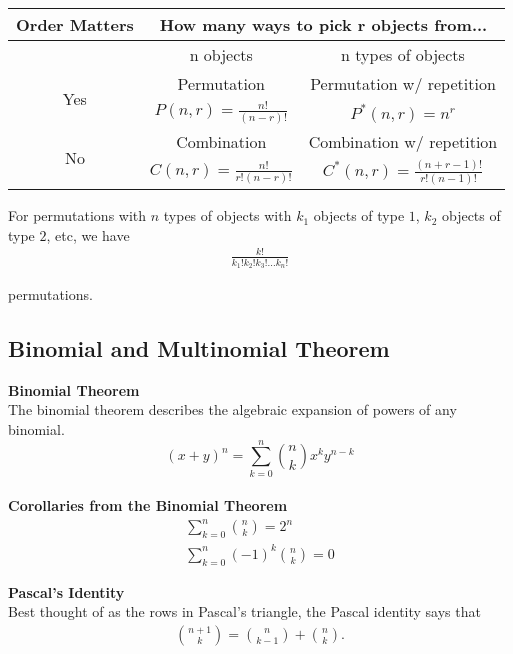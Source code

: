 \documentclass{article}
\numberwithin{theorem}{subsection}
\numberwithin{theorem}{subsubsection}
\numberwithin{lemma}{subsection}
\numberwithin{lemma}{subsubsection}
\theoremstyle{definition}
\numberwithin{definition}{subsection}
\numberwithin{definition}{subsubsection}
\begin{document}
\begin{table}[H]
    \centering
    \begin{tabular}{c | c | c}
        Order Matters & \multicolumn{2}{c}{How many ways to pick r objects from...}\\
        \hline
         & n objects & n types of objects \\
         \hline
        \multirow{2}{*}{Yes} & Permutation & Permutation w/ repetition \\
        & $P(n,r) = \frac{n!}{(n-r)!}$ & $P^{*}(n,r) = n^{r}$ \\
        \hline
        \multirow{2}{*}{No} & Combination & Combination w/ repetition \\
        & $C(n,r) = \frac{n!}{r!(n-r)!}$ & $C^{*}(n,r) = \frac{(n+r-1)!}{r!(n-1)!}$ \\
    \end{tabular}
    \label{tab:my_label}
\end{table}

\noindent For permutations with $n$ types of objects with $k_{1}$ objects of type $1$, $k_{2}$ objects of type $2$, etc, we have
\begin{gather*}
    \frac{k!}{k_{1}!k_{2}!k_{3}!...k_{n}!}
\end{gather*}

\noindent permutations.

\subsection{Binomial and Multinomial Theorem}

\noindent \textbf{Binomial Theorem} \\
\indent The binomial theorem describes the algebraic expansion of powers of any binomial.
\begin{equation*}
    (x+y)^{n} = \sum_{k=0}^{n} {n\choose k} x^{k}y^{n-k}
\end{equation*}
\\

\noindent \textbf{Corollaries from the Binomial Theorem} \\
\begin{gather*}
    \sum_{k=0}^{n} {n\choose k} = 2^{n} \\
    \sum_{k=0}^{n} (-1)^{k} {n\choose k} = 0
\end{gather*}

\noindent \textbf{Pascal's Identity} \\
Best thought of as the rows in Pascal's triangle, the Pascal identity says that
\begin{gather*}
    {n+1 \choose k} = {n \choose k-1} + {n\choose k}.
\end{gather*}
\end{document}
